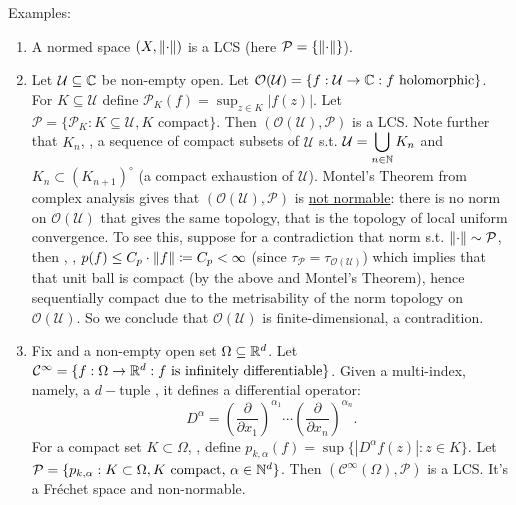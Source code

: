 \documentclass{article}
\begin{document}
\begin{examplesblock}{Examples:}\label{examples: 4}
    \begin{enumerate}
        \item A normed space $(X, \left\lVert\cdot\right\rVert)$ is a LCS (here $\mathcal{P}=\{\left\lVert\cdot\right\rVert\}$).
        \item Let $\mathcal{U}\subseteq \mathbb{C}$ be non-empty open. Let $\mathcal{O}(\mathcal{U})=\{f:\mathcal{U}\to\mathbb{C}: f \text{ holomorphic}\}$.\\
        For $K\subseteq \mathcal{U}$ define 
        $
        \mathcal{P}_K(f) = \displaystyle\sup_{z\in K}|f(z)|.
        $
        Let $\mathcal{P}=\{\mathcal{P}_K:K\subseteq\mathcal{U}, K \text{ compact}\}$. Then $(\mathcal{O}(\mathcal{U}), \mathcal{P})$ is a LCS. Note further that \isthere $K_n$, , a sequence of compact subsets of $\mathcal{U}$ s.t. $\mathcal{U}=\displaystyle\bigcup_{n\in\mathbb{N}}K_n$ and  $K_n\subset (K_{n+1})^{\circ}$ (a compact exhaustion of $\mathcal{U}$). Montel's Theorem from complex analysis gives that $(\mathcal{O}(\mathcal{U}), \mathcal{P})$ is \noindent\underline{not normable}: there is no norm on $\mathcal{O}(\mathcal{U})$ that gives the same topology, that is the topology of local uniform convergence. To see this, suppose for a contradiction that \isthere norm s.t. $\left\lVert\cdot\right\rVert\sim\mathcal{P}$, then , , $p(f)\leq C_p\cdot\left\lVert f\right\rVert\coloneqq C_p<\infty$ (since $\tau_\mathcal{P} = \tau_{\mathcal{O}(\mathcal{U})}$) which implies that that unit ball is compact (by the above and Montel's Theorem), hence sequentially compact due to the metrisability of the norm topology on $\mathcal{O}(\mathcal{U})$. So we conclude that $\mathcal{O}(\mathcal{U})$ is finite-dimensional, a contradition.
        \item Fix  and a non-empty open set $\Omega\subseteq \mathbb{R}^d$. Let $\mathcal{C}^\infty =\{f:\Omega\to\mathbb{R}^d:f \text{ is infinitely differentiable}\}$. Given a multi-index, namely, a $d-$tuple , it defines a differential operator:
        $$
        D^\alpha = \left(\frac{\partial}{\partial x_1}\right)^{\alpha_1}\cdots \left(\frac{\partial}{\partial x_n}\right)^{\alpha_n}.
        $$
        For a compact set $K\subset\Omega$, , define $p_{k,\alpha}(f)= \sup\{|D^{\alpha}f(z)|:z\in K\}$. Let $\mathcal{P}= \{p_{k,\alpha}:K\subset\Omega, K \text{ compact, $\alpha\in\mathbb{N}^d$}\}$. Then $(\mathcal{C}^\infty(\Omega), \mathcal{P})$ is a LCS. It's a Fr\'{e}chet space and non-normable.
    \end{enumerate}
\end{examplesblock}
\end{document}
